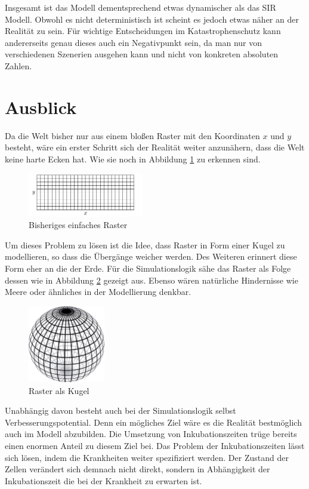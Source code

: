 \documentclass[10pt,twocolumn]{scrartcl}
\begin{document}
Insgesamt ist das Modell dementsprechend etwas dynamischer als das SIR Modell. Obwohl es nicht deterministisch ist scheint es jedoch etwas näher an der Realität zu sein. Für wichtige Entscheidungen im Katastrophenschutz kann andererseits genau dieses auch ein Negativpunkt sein, da man nur von verschiedenen Szenerien ausgehen kann und nicht von konkreten absoluten Zahlen.

\section*{Ausblick}
Da die Welt bisher nur aus einem bloßen Raster mit den Koordinaten $x$ und $y$ besteht, wäre ein erster Schritt sich der Realität weiter anzunähern, dass die Welt keine harte Ecken hat. Wie sie noch in Abbildung \ref{fig:welt} zu erkennen sind.
\begin{figure}[H]
	\centering
	\includegraphics[width= 0.45\textwidth]{./images/map.png}
	\caption{Bisheriges einfaches Raster}
	\label{fig:welt}
\end{figure}
Um dieses Problem zu lösen ist die Idee, dass Raster in Form einer Kugel zu modellieren, so dass die Übergänge weicher werden. Des Weiteren erinnert diese Form eher an die der Erde. Für die Simulationslogik sähe das Raster als Folge dessen wie in Abbildung \ref{fig:kugel} gezeigt aus. Ebenso wären natürliche Hindernisse wie Meere oder ähnliches in der Modellierung denkbar.
\begin{figure}[H]
	\centering
	\includegraphics[width= 0.3\textwidth]{./images/kugel.pdf}
	\caption{Raster als Kugel\cite{WikiKugel:2014}}
	\label{fig:kugel}
\end{figure}


Unabhängig davon besteht auch bei der Simulationslogik selbst Verbesserungspotential. Denn ein mögliches Ziel wäre es die Realität bestmöglich auch im Modell abzubilden.
Die Umsetzung von Inkubationszeiten trüge bereits einen enormen Anteil zu diesem Ziel bei. 
Das Problem der Inkubationszeiten lässt sich lösen, indem die Krankheiten weiter spezifiziert werden. Der Zustand der Zellen verändert sich demnach nicht direkt, sondern in Abhängigkeit der Inkubationszeit die bei der Krankheit zu erwarten ist.
\end{document}
